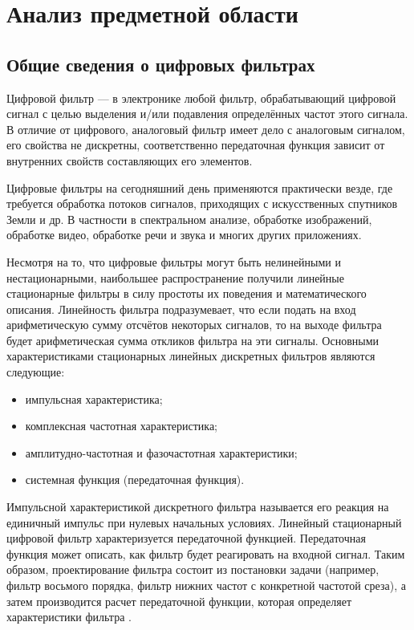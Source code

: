 
\chapter{Анализ предметной области}
\section{Общие сведения о цифровых фильтрах}
Цифровой фильтр --- в электронике любой фильтр, обрабатывающий цифровой сигнал с целью выделения и/или подавления определённых частот этого сигнала. В отличие от цифрового, аналоговый фильтр имеет дело с аналоговым сигналом, его свойства не дискретны, соответственно передаточная функция зависит от внутренних свойств составляющих его элементов.\cite{didfileters}

Цифровые фильтры на сегодняшний день применяются практически везде, где требуется обработка потоков сигналов, приходящих с искусственных спутников Земли и др. В частности в спектральном анализе, обработке изображений, обработке видео, обработке речи и звука и многих других приложениях.

Несмотря на то, что цифровые фильтры могут быть нелинейными и нестационарными, наибольшее распространение получили линейные стационарные фильтры в силу простоты их поведения и математического описания. Линейность фильтра подразумевает, что если подать на вход арифметическую сумму отсчётов некоторых сигналов, то на выходе фильтра будет арифметическая сумма откликов фильтра на эти сигналы. Основными характеристиками стационарных линейных дискретных фильтров являются следующие:

\begin{itemize}
	\item импульсная характеристика;
	\item комплексная частотная характеристика;
	\item амплитудно-частотная и фазочастотная характеристики;
	\item системная функция (передаточная функция).	
\end{itemize}

Импульсной характеристикой дискретного фильтра называется его реакция на единичный импульс при нулевых начальных условиях. Линейный стационарный цифровой фильтр характеризуется передаточной функцией. Передаточная функция может описать, как фильтр будет реагировать на входной сигнал. Таким образом, проектирование фильтра состоит из постановки задачи (например, фильтр восьмого порядка, фильтр нижних частот с конкретной частотой среза), а затем производится расчет передаточной функции, которая определяет характеристики фильтра \cite{easyguide}.

